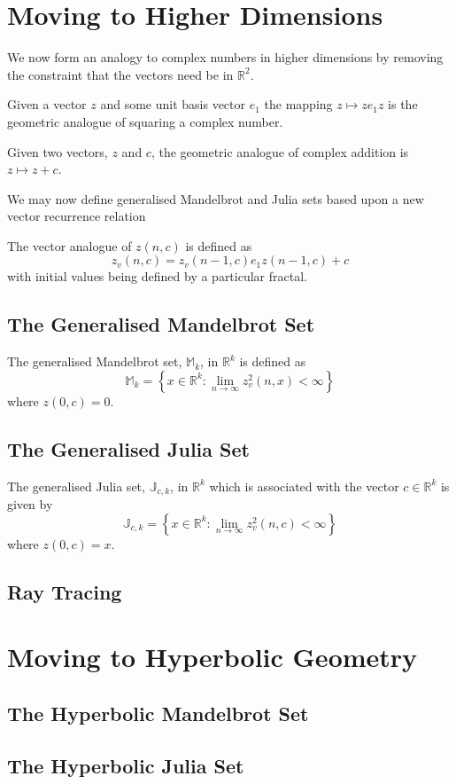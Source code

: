 \section{Moving to Higher Dimensions}

We now form an analogy to complex numbers in higher dimensions
by removing the constraint that the vectors need be in $\mathbb{R}^2$.

\begin{definition}
Given a vector $z$ and some unit basis vector $e_1$ the mapping
$z \mapsto ze_1z$ is the geometric analogue of squaring a complex number.
\end{definition}

\begin{definition}
Given two vectors, $z$ and $c$, the geometric analogue of complex addition
is $z \mapsto z + c$.
\end{definition}

We may now define generalised Mandelbrot and Julia sets based upon
a new vector recurrence relation
\begin{definition}
The vector analogue of $z(n,c)$ is defined as
\[
z_v(n,c) = z_v(n-1,c) e_1 z(n-1,c) + c
\]
with initial values being defined by a particular fractal.
\end{definition}

\subsection{The Generalised Mandelbrot Set}

\begin{definition}
The generalised Mandelbrot set, $\mathbb{M}_k$, in $\mathbb{R}^k$ 
    is defined as
\[
\mathbb{M}_k = 
\left\{x \in \mathbb{R}^k 
: \lim_{n \rightarrow \infty} z_v^2(n,x) < \infty \right\} 
\]
where $z(0,c) = 0$.
\end{definition}

\subsection{The Generalised Julia Set}

\begin{definition}
The generalised Julia set, $\mathbb{J}_{c,k}$, in $\mathbb{R}^k$
which is associated with the vector $c \in \mathbb{R}^k$ is given by
\[
\mathbb{J}_{c,k} = 
\left\{x \in \mathbb{R}^k
: \lim_{n \rightarrow \infty} z_v^2(n,c) < \infty \right\} 
\]
where $z(0,c) = x$.
\end{definition}

\subsection{Ray Tracing}

\section{Moving to Hyperbolic Geometry}

\subsection{The Hyperbolic Mandelbrot Set}

\subsection{The Hyperbolic Julia Set}
